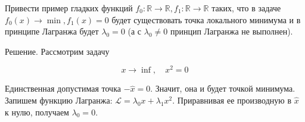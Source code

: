 \begin{task}
Привести пример гладких функций $f_{0}: \mathbb{R} \rightarrow \mathbb{R}, f_{1}: \mathbb{R} \rightarrow \mathbb{R}$ таких, что в задаче $f_{0}(x) 
\rightarrow \min , f_{1}(x)=0$ будет существовать точка локального минимума и в принципе Лагранжа будет $\lambda_{0}=0$ (а с $\lambda_{0} \neq 0$ принцип Лагранжа не выполнен).

Решение. Рассмотрим задачу

$$
x \rightarrow \inf , \quad x^{2}=0
$$

Единственная допустимая точка $-\hat{x}=0$. Значит, она и будет точкой минимума. Запишем функцию Лагранжа: $\mathcal{L}=\lambda_{0} x+\lambda_{1} x^{2}$. Приравнивая ее производную в $\hat{x}$ к нулю, получаем $\lambda_{0}=0$.
\end{task}
